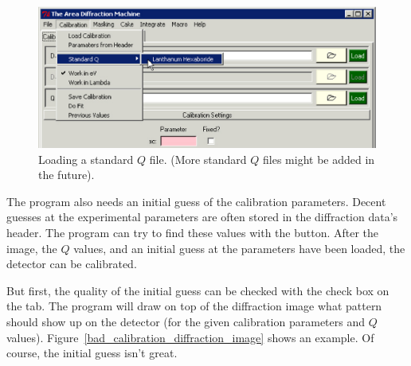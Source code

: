\begin{figure}
    \centering
    \includegraphics[scale=.75]
    {figures/standard_q.eps}
    \caption{Loading a standard $Q$ file.
    (More standard $Q$ files might be added in the future).}
    \label{standard_q_example}
\end{figure}

The program also
needs an initial guess of the calibration parameters. 
Decent guesses at the experimental parameters are often
stored in the diffraction data's header. 
The program can try to find these values with the 
 button. After the image, the $Q$ values, 
and an initial guess at the parameters have been loaded, 
the detector can be calibrated.

But first, the quality of the initial guess can be checked
with the 
check box on the  tab. The program will draw
on top of the diffraction image what pattern should show 
up on the detector (for the given calibration parameters and $Q$
values). Figure~\ref{bad_calibration_diffraction_image}
shows an example. Of course, the initial guess isn't
great. 

